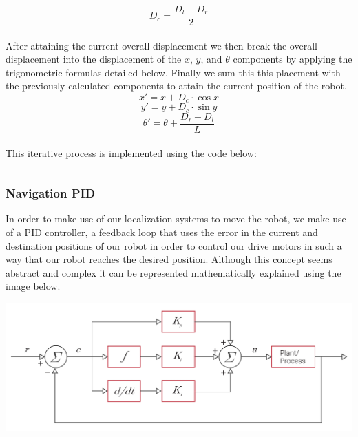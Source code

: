 \documentclass[a4paper,12pt]{article}
\begin{document}
\begin{equation*}
D_c = \frac{D_l - D_r}{2}
\end{equation*}
\\
After attaining the current overall displacement we then break the overall displacement into the displacement of the $x$, $y$, and $\theta$ components by applying the trigonometric formulas detailed below. Finally we sum this this placement with the previously calculated components to attain the current position of the robot.
\begin{equation*}
x' = x + D_c \cdot \cos{x}
\end{equation*}
\begin{equation*}
y' = y + D_c \cdot \sin{y}
\end{equation*}
\begin{equation*}
\theta' = \theta + \frac{D_r - D_l}{L}
\end{equation*}
\\
This iterative process is implemented using the code below:
\inputminted[linenos, numbersep=5pt, tabsize=4, frame=lines, label=Odometry Pseudocode, escapeinside=||,mathescape=true]{java}{{CodeFiles/WheelOdometry.java}}


\thispagestyle{empty}
\subsubsection{Navigation PID}
In order to make use of our localization systems to move the robot, we make use of a PID controller, a feedback loop that uses the error in the current and destination positions of our robot in order to control our drive motors in such a way that our robot reaches the desired position. Although this concept seems abstract and complex it can be represented mathematically explained using the image below.
\begin{center}
\includegraphics[width=\textwidth]{cnt_pid.jpg}
\end{center}
\end{document}
